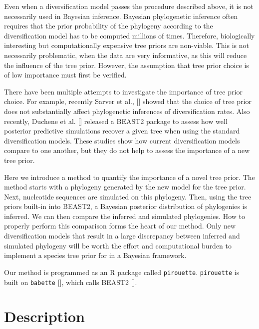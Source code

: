 \documentclass{article}
\begin{document}
Even when a diversification model passes the procedure described above,
it is not necessarily used in Bayesian inference.
Bayesian phylogenetic inference often requires that the prior probability of the phylogeny according to the diversification model has to be computed millions of times. Therefore, biologically interesting but computationally expensive tree priors are non-viable. This is not necessarily problematic, when the data are very informative, as this will reduce the influence of the tree prior.
However, the assumption that tree prior choice is of low importance must first be verified.

There have been multiple attempts to investigate the importance of tree
prior choice. For example, recently Sarver et al., [\cite{sarver2019choice}] 
showed that the choice of tree prior does not 
substantially affect phylogenetic inferences of diversification rates.
Also recently, Duchene et al. [\cite{duchene2018phylodynamic}] released
a BEAST2 package to assess how well posterior predictive simulations
recover a given tree when using the standard diversification models.
These studies show how current diversification models compare
to one another, but they do not help to assess the importance of a new tree prior. 

Here we introduce a method to quantify the importance of a novel tree prior.
The method starts with a phylogeny generated by the new model for the tree prior. Next, nucleotide sequences are simulated on this phylogeny. Then, using the tree priors built-in into BEAST2, a Bayesian posterior distribution of phylogenies is inferred. We can then compare the inferred and simulated phylogenies. How to properly perform this comparison forms the heart of our method.
Only new diversification models that result in a large discrepancy between inferred and simulated phylogeny will be worth the effort and computational burden 
to implement a species tree prior for in a Bayesian framework.

Our method is programmed as an R package called \verb;pirouette;.
\verb;pirouette; is built on \verb;babette; [\cite{bilderbeek2018babette}], 
which calls BEAST2 [\cite{bouckaert2014beast}]. 

\section{Description}
\end{document}
